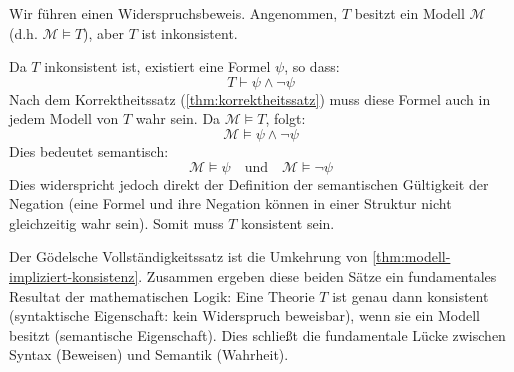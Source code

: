 \begin{math-stroke}

\begin{short-proof}
Wir führen einen Widerspruchsbeweis. Angenommen, $T$ besitzt ein Modell $\mathcal{M}$ (d.h. $\mathcal{M} \models T$), aber $T$ ist inkonsistent.
        
Da $T$ inkonsistent ist, existiert eine Formel $\psi$, so dass:
\[ T \vdash \psi \land \neg \psi \]
Nach dem Korrektheitssatz (\cref{thm:korrektheitssatz}) muss diese Formel auch in jedem Modell von $T$ wahr sein. Da $\mathcal{M} \models T$, folgt:
\[ \mathcal{M} \models \psi \land \neg \psi \]
Dies bedeutet semantisch:
\[ \mathcal{M} \models \psi \quad \text{und} \quad \mathcal{M} \models \neg \psi \]
Dies widerspricht jedoch direkt der Definition der semantischen Gültigkeit der Negation (eine Formel und ihre Negation können in einer Struktur nicht gleichzeitig wahr sein). Somit muss $T$ konsistent sein.
\end{short-proof}
\end{math-stroke}

\begin{ai-global-state-checkpoint-invisible-content}
\end{ai-global-state-checkpoint-invisible-content}

\begin{math-stroke}

\begin{explanation-of-steps}
Der Gödelsche Vollständigkeitssatz ist die Umkehrung von \cref{thm:modell-impliziert-konsistenz}. Zusammen ergeben diese beiden Sätze ein fundamentales Resultat der mathematischen Logik: Eine Theorie $T$ ist genau dann konsistent (syntaktische Eigenschaft: kein Widerspruch beweisbar), wenn sie ein Modell besitzt (semantische Eigenschaft). Dies schließt die fundamentale Lücke zwischen Syntax (Beweisen) und Semantik (Wahrheit).
\end{explanation-of-steps}
\end{math-stroke}

